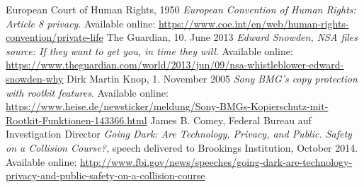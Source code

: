 \documentclass[a4paper, 11pt]{article}
\begin{document}
\begin{thebibliography}{9}
     European Court of Human Rights, 1950 \emph{European Convention of Human Rights: Article 8  privacy}. Available online: \href{https://www.coe.int/en/web/human-rights-convention/private-life}{https://www.coe.int/en/web/human-rights-convention/private-life}
     The Guardian, 10. June 2013 \emph{Edward Snowden, NSA files source: If they want to get you, in time they will}. Available online: \href{https://www.theguardian.com/world/2013/jun/09/nsa-whistleblower-edward-snowden-why}{https://www.theguardian.com/world/2013/jun/09/nsa-whistleblower-edward-snowden-why}
     Dirk Martin Knop, 1. November 2005 \emph{Sony BMG's copy protection with rootkit features}. Available online: \href{https://www.heise.de/newsticker/meldung/Sony-BMGs-Kopierschutz-mit-Rootkit-Funktionen-143366.html}{https://www.heise.de/newsticker/meldung/Sony-BMGs-Kopierschutz-mit-Rootkit-Funktionen-143366.html}
     James B. Comey, Federal Bureau auf Investigation Director \emph{Going Dark: Are Technology, Privacy, and Public. Safety on a Collision Course?,} speech delivered to Brookings Institution, October 2014. Available online: \href{http://www.fbi.gov/news/speeches/going-dark-are-technology-privacy-and-public-safety-on-a-collision-course}{http://www.fbi.gov/news/speeches/going-dark-are-technology-privacy-and-public-safety-on-a-collision-course}
\end{thebibliography}
\end{document}
